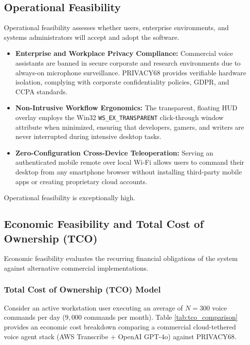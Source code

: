 \subsection{Operational Feasibility}
Operational feasibility assesses whether users, enterprise environments, and systems administrators will accept and adopt the software.
\begin{itemize}
    \item \textbf{Enterprise and Workplace Privacy Compliance:} Commercial voice assistants are banned in secure corporate and research environments due to always-on microphone surveillance. PRIVACY68 provides verifiable hardware isolation, complying with corporate confidentiality policies, GDPR, and CCPA standards.
    \item \textbf{Non-Intrusive Workflow Ergonomics:} The transparent, floating HUD overlay employs the Win32 \texttt{WS\_EX\_TRANSPARENT} click-through window attribute when minimized, ensuring that developers, gamers, and writers are never interrupted during intensive desktop tasks.
    \item \textbf{Zero-Configuration Cross-Device Teleoperation:} Serving an authenticated mobile remote over local Wi-Fi allows users to command their desktop from any smartphone browser without installing third-party mobile apps or creating proprietary cloud accounts.
\end{itemize}
Operational feasibility is exceptionally high.

\subsection{Economic Feasibility and Total Cost of Ownership (TCO)}
Economic feasibility evaluates the recurring financial obligations of the system against alternative commercial implementations.

\subsubsection{Total Cost of Ownership (TCO) Model}
Consider an active workstation user executing an average of $N = 300$ voice commands per day ($9,000$ commands per month). Table \ref{tab:tco_comparison} provides an economic cost breakdown comparing a commercial cloud-tethered voice agent stack (AWS Transcribe + OpenAI GPT-4o) against PRIVACY68.

